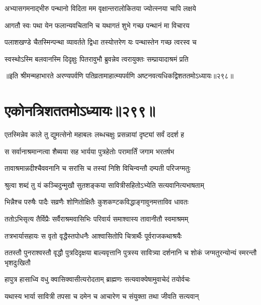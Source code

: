 


\twolineshloka
{अभ्यासगमनाद्भीरु पन्थानो विदिता मम}
{वृक्षान्तरालोकितया ज्योत्स्नया चापि लक्षये}


\twolineshloka
{आगतौ स्वः पथा येन फलान्यवचितानि च}
{यथागतं शुभे गच्छ पन्थानं मा विचारय}


\twolineshloka
{पलाशखण्डे चैतस्मिन्पन्था व्यावर्तते द्विधा}
{तस्योत्तरेण यः पन्थास्तेन गच्छ त्वरस्व च}


\twolineshloka
{स्वस्थोऽस्मि बलवानस्मि दिदृक्षुः पितरावुभौ}
{ब्रुवन्नेव त्वरायुक्तः सम्प्रायादाश्रमं प्रति}


॥इति श्रीमन्महाभारते अरण्यपर्वणि पतिव्रतामाहात्म्यपर्वणि अष्टनवत्यधिकद्विशततमोऽध्यायः॥२९८॥


\chapter{एकोनत्रिशततमोऽध्यायः॥२९९॥}


\twolineshloka
{एतस्मिन्नेव काले तु द्युमत्सेनो महाबलः}
{लब्धचक्षुः प्रसन्नायां दृष्ट्यां सर्वं ददर्श ह}


\twolineshloka
{स सर्वानाश्रमान्गत्वा शैब्यया सह भार्यया}
{पुत्रहेतोः परामार्तिं जगाम भरतर्षभ}


\twolineshloka
{तावाश्रमान्नदीश्चैववनानि च सरांसि च}
{तस्यां निशि विचिन्वन्तौ दम्पती परिजग्मतुः}


\twolineshloka
{श्रुत्वा शब्दं तु यं कञ्चिदुन्मुखौ सुतशङ्कया}
{सावित्रीसहितोऽभ्येति सत्यवानित्यभाषताम्}


\twolineshloka
{भिन्नैश्च परुषैः पादैः सव्रणैः शोणितोक्षितैः}
{कुशकण्टकविद्धाङ्गावुनमत्ताविव धावतः}


\twolineshloka
{ततोऽभिसृत्य तैर्विप्रैः सर्वैराश्रमवासिभिः}
{परिवार्य समाश्वास्य तावानीतौ स्वमाश्रमम्}


\twolineshloka
{तत्रभार्यासहायः स वृतो वृद्धैस्तपोधनैः}
{आश्वासितोपि चित्रार्थैः पूर्वराजकथाश्रयैः}


\threelineshloka
{ततस्तौ पुनराश्वस्तौ वृद्धौ पुत्रदिदृक्षया}
{बाल्यवृत्तानि पुत्रस्य सावित्र्या दर्शनानि च}
{शोकं जग्मतुरन्योन्यं स्मरन्तौ भृशदुःखितौ}


\twolineshloka
{हापुत्र हासाध्वि वधु क्वासिक्वासीत्यरोदताम्}
{ब्राह्मणः सत्यवाक्येषामुवाचेदं तयोर्वचः}




\twolineshloka
{यथास्य भार्या सावित्री तपसा च दमेन च}
{आचारेण च संयुक्ता तथा जीवति सत्यवान्}

